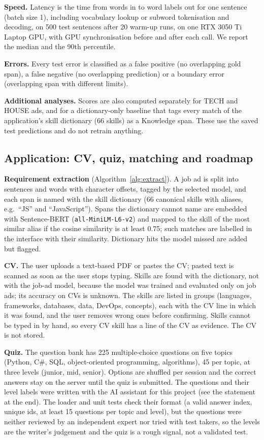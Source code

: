\documentclass[runningheads]{llncs}
\begin{document}
\textbf{Speed.} Latency is the time from words in to word labels out for one sentence (batch size 1),
including vocabulary lookup or subword tokenisation and decoding, on 500 test sentences after 20
warm-up runs, on one RTX 3050 Ti Laptop GPU, with GPU synchronisation before and after each call. We
report the median and the 90th percentile.

\textbf{Errors.} Every test error is classified as a false positive (no overlapping gold span), a false
negative (no overlapping prediction) or a boundary error (overlapping span with different limits).

\textbf{Additional analyses.} Scores are also computed separately for TECH and HOUSE ads, and for a
dictionary-only baseline that tags every match of the application's skill dictionary (66 skills) as a
Knowledge span. These use the saved test predictions and do not retrain anything.

\subsection{Application: CV, quiz, matching and roadmap}
\textbf{Requirement extraction} (Algorithm~\ref{alg:extract}). A job ad is split into sentences and
words with character offsets, tagged by the selected model, and each span is named with the skill
dictionary (66 canonical skills with aliases, e.g.\ ``JS'' and ``JavaScript''). Spans the dictionary
cannot name are embedded with Sentence-BERT (\texttt{all-MiniLM-L6-v2}) and mapped to the skill of the
most similar alias if the cosine similarity is at least 0.75; such matches are labelled in the
interface with their similarity. Dictionary hits the model missed are added but flagged.

\textbf{CV.} The user uploads a text-based PDF or pastes the CV; pasted text is scanned as soon as the
user stops typing. Skills are found with the dictionary, not with the job-ad model, because the model
was trained and evaluated only on job ads; its accuracy on CVs is unknown. The skills are listed in
groups (languages, frameworks, databases, data, DevOps, concepts), each with the CV line in which it was
found, and the user removes wrong ones before confirming. Skills cannot be typed in by hand, so every
CV skill has a line of the CV as evidence. The CV is not stored.

\textbf{Quiz.} The question bank has 225 multiple-choice questions on five topics (Python, C\#, SQL,
object-oriented programming, algorithms), 45 per topic, at three levels (junior, mid, senior). Options
are shuffled per session and the correct answers stay on the server until the quiz is submitted.
The questions and their level labels were written with the AI assistant for this project (see the
statement at the end). The loader and unit tests check their format (a valid answer index, unique ids, at
least 15 questions per topic and level), but the questions were neither reviewed by an independent expert nor tried with test
takers, so the levels are the writer's judgement and the quiz is a rough signal, not a validated test.
\end{document}
